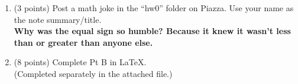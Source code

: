 \begin{enumerate}[label=\textbf{\arabic*.}]
    \item (3 points) Post a math joke in the ``hw0'' folder on Piazza.
    Use your name as the note summary/title. \\
    \textbf{Why was the equal sign so humble? Because it knew it wasn't 
    less than or greater than anyone else.}
    
    \item (8 points) Complete Pt B in \LaTeX. \\
    (Completed separately in the attached file.)
\end{enumerate}